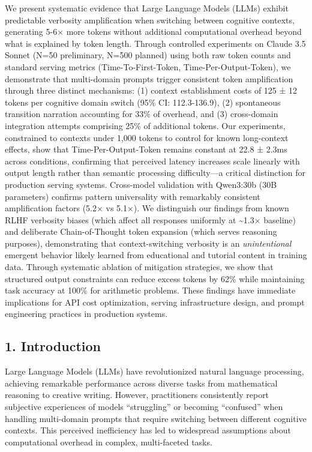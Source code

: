 \documentclass[
  11pt]{article}
\begin{document}
We present systematic evidence that Large Language Models (LLMs) exhibit
predictable verbosity amplification when switching between cognitive
contexts, generating 5-6× more tokens without additional computational
overhead beyond what is explained by token length. Through controlled
experiments on Claude 3.5 Sonnet (N=50 preliminary, N=500 planned) using
both raw token counts and standard serving metrics (Time-To-First-Token,
Time-Per-Output-Token), we demonstrate that multi-domain prompts trigger
consistent token amplification through three distinct mechanisms: (1)
context establishment costs of 125 ± 12 tokens per cognitive domain
switch (95\% CI: 112.3-136.9), (2) spontaneous transition narration
accounting for 33\% of overhead, and (3) cross-domain integration
attempts comprising 25\% of additional tokens. Our experiments,
constrained to contexts under 1,000 tokens to control for known
long-context effects, show that Time-Per-Output-Token remains constant
at 22.8 ± 2.3ms across conditions, confirming that perceived latency
increases scale linearly with output length rather than semantic
processing difficulty---a critical distinction for production serving
systems. Cross-model validation with Qwen3:30b (30B parameters) confirms
pattern universality with remarkably consistent amplification factors
(5.2× vs 5.1×). We distinguish our findings from known RLHF verbosity
biases (which affect all responses uniformly at \textasciitilde1.3×
baseline) and deliberate Chain-of-Thought token expansion (which serves
reasoning purposes), demonstrating that context-switching verbosity is
an \emph{unintentional} emergent behavior likely learned from
educational and tutorial content in training data. Through systematic
ablation of mitigation strategies, we show that structured output
constraints can reduce excess tokens by 62\% while maintaining task
accuracy at 100\% for arithmetic problems. These findings have immediate
implications for API cost optimization, serving infrastructure design,
and prompt engineering practices in production systems.

\subsection{1. Introduction}\label{introduction}

Large Language Models (LLMs) have revolutionized natural language
processing, achieving remarkable performance across diverse tasks from
mathematical reasoning to creative writing. However, practitioners
consistently report subjective experiences of models ``struggling'' or
becoming ``confused'' when handling multi-domain prompts that require
switching between different cognitive contexts. This perceived
inefficiency has led to widespread assumptions about computational
overhead in complex, multi-faceted tasks.
\end{document}

